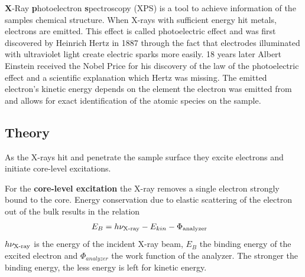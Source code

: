 \label{section:XPS} 
\textbf{X}-Ray \textbf{p}hotoelectron \textbf{s}pectroscopy (XPS) is a tool to achieve information of the samples chemical structure.
When X-rays with sufficient energy hit metals, electrons are emitted. This effect is called photoelectric effect and was first discovered by Heinrich Hertz in 1887 through the fact that electrodes illuminated with ultraviolet light create electric sparks more easily. \cite{hertz_ueber_1887} 18 years later Albert Einstein received the Nobel Price for his discovery of the law of the photoelectric effect\cite{_nobel_2015} and a scientific explanation which Hertz was missing. The emitted electron's kinetic energy depends on the element the electron was emitted from and allows for exact identification of the atomic species on the sample.

\subsection{Theory}
As the X-rays hit and penetrate the sample surface they excite electrons and initiate core-level excitations.

For the \textbf{core-level excitation} the X-ray removes a single electron strongly bound to the core. Energy conservation due to elastic scattering of the electron out of the bulk results in the relation 
\begin{align}
E_B 	&=h\nu_{\textnormal{X-ray}}-E_{kin}-\Phi_{\textnormal{analyzer}}
\end{align}
 $h\nu_{\textnormal{X-ray}}$ is the energy of the incident X-ray beam, $E_B$ the binding energy of the excited electron and $\Phi_{analyzer}$ the work function of the analyzer. The stronger the binding energy, the less energy is left for kinetic energy.


